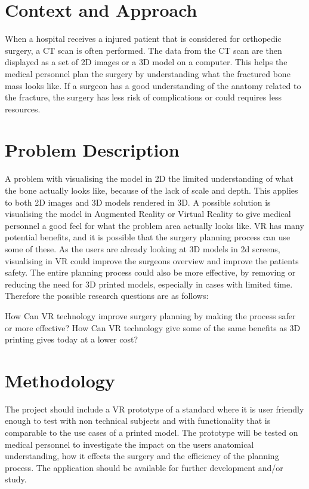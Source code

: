 \documentclass[a4paper]{report}
\begin{document}
\section{Context and Approach}
When a hospital receives a injured patient that is considered for orthopedic surgery, a CT scan is
often performed. The data from the CT scan are then displayed as a set of 2D images or a 3D model on a computer. This helps the medical personnel plan the surgery by understanding what the fractured bone mass looks like.
If a surgeon has a good understanding of the anatomy related to the fracture,
the surgery has less risk of complications or could requires less resources.
\section{Problem Description}
A problem with visualising the model in 2D the limited understanding of what the bone actually looks like, because of the lack of scale and depth. This applies to both 2D images and 3D models rendered in 3D.
A possible solution is visualising the model in Augmented Reality or Virtual Reality to give medical personnel a good feel for what the problem area actually looks like.
VR has many potential benefits, and it is possible that the surgery planning process can use some of these. As the users are already looking at 3D models in 2d screens, visualising in VR could improve the surgeons overview and improve the patients safety. The entire planning process could also be more effective, by removing or reducing the need for 3D printed models, especially in cases with limited time. Therefore the possible research questions are as follows:

How Can VR technology improve surgery planning by making the process safer or more effective?
How Can VR technology give some of the same benefits as 3D printing gives today at a lower cost?

\section{Methodology}

The project should include a VR prototype of a standard where it is
user friendly enough to test with non technical subjects and with functionality
that is comparable to the use cases of a printed model.
The prototype will be tested on medical personnel to investigate the impact on the users anatomical understanding, how it effects the surgery and the efficiency of the planning process.
The application should be available for further development and/or study.
\end{document}
